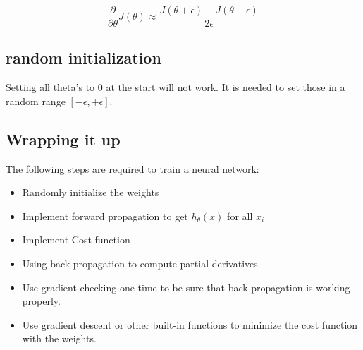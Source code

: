\documentclass{article}
\begin{document}
$$\frac{\partial}{\partial \theta}J(\theta) \approx \frac{J(\theta + \epsilon)
- J(\theta - \epsilon)}{2\epsilon} $$

\subsection{random initialization}
Setting all theta's to 0 at the start will not work. It is needed to set those
in a random range $[-\epsilon,+\epsilon]$.
\subsection{Wrapping it up}
The following steps are required to train a neural network:
\begin{itemize}
  \item Randomly initialize the weights
  \item Implement forward propagation to get $h_\theta(x)$ for all $x_i$
  \item Implement Cost function
  \item Using back propagation to compute partial derivatives
  \item Use gradient checking one time to be sure that back propagation
        is working properly.
  \item Use gradient descent or other built-in functions to minimize the cost
        function with the weights. 


\end{itemize}
\end{document}
